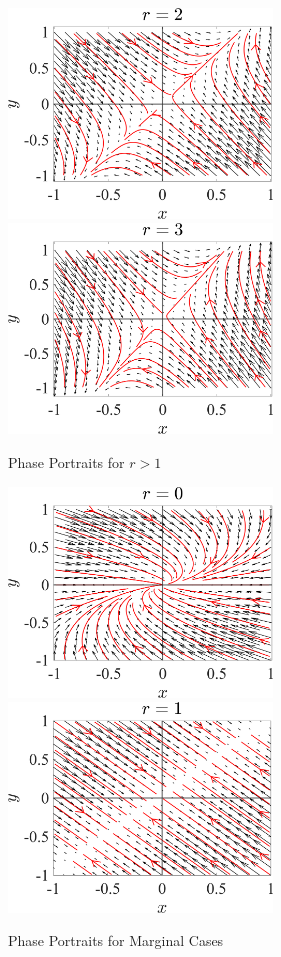 \documentclass[11pt]{article}
\begin{document}
\begin{figure}[h]
\centering
\includegraphics[width=7cm]{phase_portrait_r_2}
\includegraphics[width=7cm]{phase_portrait_r_3}
\caption{Phase Portraits for $r>1$}
\end{figure}

\begin{figure}[h]
\centering
\includegraphics[width=7cm]{phase_portrait_r_0}
\includegraphics[width=7cm]{phase_portrait_r_1}
\caption{Phase Portraits for Marginal Cases}
\end{figure}
\end{document}
